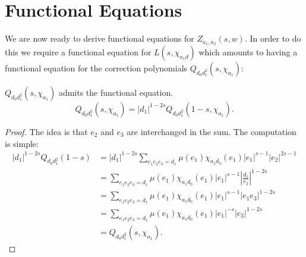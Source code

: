 \documentclass[12pt,reqno,oneside]{amsart}
\begin{document}
\section{Functional Equations}
    We are now ready to derive functional equations for $Z_{a_{1},a_{2}}(s,w)$. In order to do this we require a functional equation for $L(s,\chi_{a_{1}d})$ which amounts to having a functional equation for the correction polynomials $Q_{d_{0}d_{1}^{2}}(s,\chi_{a_{1}})$:

    \begin{theorem}\label{thm:functional_equation_correction_polynomials}
        $Q_{d_{0}d_{1}^{2}}(s,\chi_{a_{1}})$ admits the functional equation.
        \[
            Q_{d_{0}d_{1}^{2}}(s,\chi_{a_{1}}) = |d_{1}|^{1-2s}Q_{d_{0}d_{1}^{2}}(1-s,\chi_{a_{1}}).
        \]
    \end{theorem}
    \begin{proof}
        The idea is that $e_{2}$ and $e_{3}$ are interchanged in the sum. The computation is simple:
        \begin{align*}
            |d_{1}|^{1-2s}Q_{d_{0}d_{1}^{2}}(1-s) &= |d_{1}|^{1-2s}\sum_{e_{1}e_{2}e_{3} = d_{1}}\mu(e_{1})\chi_{a_{1}d_{0}}(e_{1})|e_{1}|^{s-1}|e_{2}|^{2s-1} \\
            &= \sum_{e_{1}e_{2}e_{3} = d_{1}}\mu(e_{1})\chi_{a_{1}d_{0}}(e_{1})|e_{1}|^{s-1}\left|\frac{d_{1}}{e_{2}}\right|^{1-2s} \\
            &= \sum_{e_{1}e_{2}e_{3} = d_{1}}\mu(e_{1})\chi_{a_{1}d_{0}}(e_{1})|e_{1}|^{s-1}|e_{1}e_{3}|^{1-2s} \\
            &= \sum_{e_{1}e_{2}e_{3} = d_{1}}\mu(e_{1})\chi_{a_{1}d_{0}}(e_{1})|e_{1}|^{-s}|e_{3}|^{1-2s} \\
            &= Q_{d_{0}d_{1}^{2}}(s,\chi_{a_{1}}).
        \end{align*}
    \end{proof}
\end{document}
